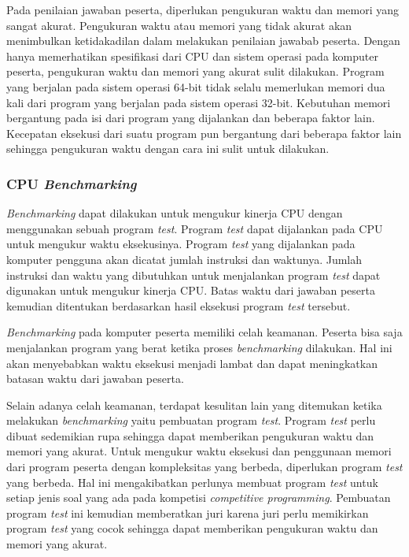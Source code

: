 \par Pada penilaian jawaban peserta, diperlukan pengukuran waktu dan memori yang sangat akurat. Pengukuran waktu atau memori yang tidak akurat akan menimbulkan ketidakadilan dalam melakukan penilaian jawabab peserta. Dengan hanya memerhatikan spesifikasi dari CPU dan sistem operasi pada komputer peserta, pengukuran waktu dan memori yang akurat sulit dilakukan. Program yang berjalan pada sistem operasi 64-bit tidak selalu memerlukan memori dua kali dari program yang berjalan pada sistem operasi 32-bit. Kebutuhan memori bergantung pada isi dari program yang dijalankan dan beberapa faktor lain. Kecepatan eksekusi dari suatu program pun bergantung dari beberapa faktor lain sehingga pengukuran waktu dengan cara ini sulit untuk dilakukan.

\subsubsection{CPU \textit{Benchmarking}}

\par \textit{Benchmarking} dapat dilakukan untuk mengukur kinerja CPU dengan menggunakan sebuah program \textit{test}. Program \textit{test} dapat dijalankan pada CPU untuk mengukur waktu eksekusinya. Program \textit{test} yang dijalankan pada komputer pengguna akan dicatat jumlah instruksi dan waktunya. Jumlah instruksi dan waktu yang dibutuhkan untuk menjalankan program \textit{test} dapat digunakan untuk mengukur kinerja CPU. Batas waktu dari jawaban peserta kemudian ditentukan berdasarkan hasil eksekusi program \textit{test} tersebut.

\par \textit{Benchmarking} pada komputer peserta memiliki celah keamanan. Peserta bisa saja menjalankan program yang berat ketika proses \textit{benchmarking} dilakukan. Hal ini akan menyebabkan waktu eksekusi menjadi lambat dan dapat meningkatkan batasan waktu dari jawaban peserta.

\par Selain adanya celah keamanan, terdapat kesulitan lain yang ditemukan ketika melakukan \textit{benchmarking} yaitu pembuatan program \textit{test}. Program \textit{test} perlu dibuat sedemikian rupa sehingga dapat memberikan pengukuran waktu dan memori yang akurat. Untuk mengukur waktu eksekusi dan penggunaan memori dari program peserta dengan kompleksitas yang berbeda, diperlukan program \textit{test} yang berbeda. Hal ini mengakibatkan perlunya membuat program \textit{test} untuk setiap jenis soal yang ada pada kompetisi \textit{competitive programming}. Pembuatan program \textit{test} ini kemudian memberatkan juri karena juri perlu memikirkan program \textit{test} yang cocok sehingga dapat memberikan pengukuran waktu dan memori yang akurat.

